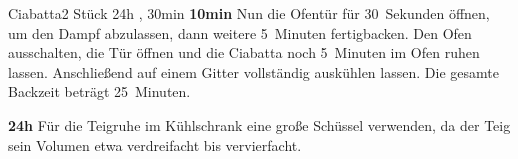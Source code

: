 \documentclass[../recipe-collections/cooking.tex]{subfiles}
\begin{document}
\begin{recipe}{Ciabatta}{2 Stück }{24h , 30min }
  \newstep{}\textbf{10min}
  Nun die Ofentür für 30~Sekunden öffnen, um den Dampf abzulassen, dann weitere 5~Minuten fertigbacken.
  Den Ofen ausschalten, die Tür öffnen und die Ciabatta noch 5~Minuten im Ofen ruhen lassen.
  Anschließend auf einem Gitter vollständig auskühlen lassen.
  Die gesamte Backzeit beträgt 25~Minuten.

  \newstep{}\textbf{24h}
  Für die Teigruhe im Kühlschrank eine große Schüssel verwenden, da der Teig sein Volumen etwa verdreifacht bis vervierfacht.

  \freeform{}\hrulefill{}

\end{recipe}
\end{document}

